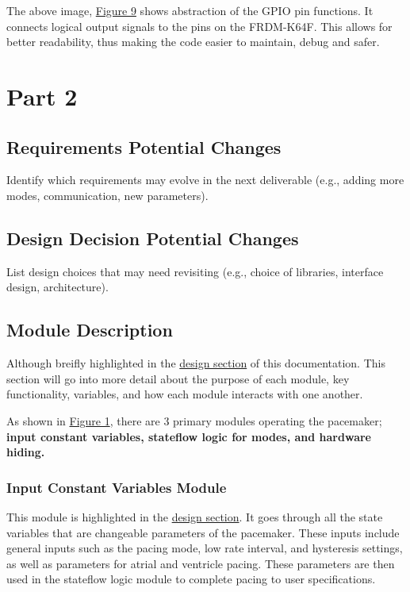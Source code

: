 \documentclass{article}
\begin{document}
The above image, \hyperref[HardHide]{Figure 9} shows abstraction of the GPIO pin functions. 
It connects logical output signals to the pins on the FRDM-K64F. This allows for better readability,
thus making the code easier to maintain, debug and safer. 

\newpage
\section{Part 2}

\subsection{Requirements Potential Changes}
Identify which requirements may evolve in the next deliverable (e.g., adding more modes, communication, new parameters).

\subsection{Design Decision Potential Changes}
List design choices that may need revisiting (e.g., choice of libraries, interface design, architecture).

\newpage
\subsection{Module Description}

Although breifly highlighted in the \hyperref[dessec]{design section} of this documentation. This section will go 
into more detail about the purpose of each module, key functionality, variables, and how each module interacts with 
one another. 

As shown in \hyperref[SimWholeView]{Figure 1}, there are 3 primary modules operating the pacemaker; \textbf{input constant variables, 
stateflow logic for modes, and hardware hiding.}

\subsubsection{Input Constant Variables Module}
This module is highlighted in the \hyperref[dessec]{design section}. It goes through all the state variables that 
are changeable parameters of the pacemaker. These inputs include general inputs such as the pacing mode, low rate interval, and hysteresis settings, as well 
as parameters for atrial and ventricle pacing. These parameters are then used in the stateflow logic module to 
complete pacing to user specifications.
\end{document}
